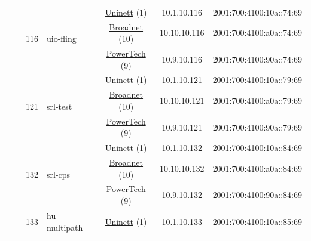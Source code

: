\begin{small}
\begin{center}
\begin{longtable}{|c|c|c|c|c|c|c|c|}
  &  & \multirow{3}{*}{\tiny{116}} & \multicolumn{1}{|l|}{\multirow{3}{*}{\tiny{uio-fling}}} & \multicolumn{2}{|c|}{\tiny{\href{https://www.uninett.no}{Uninett} (1)}} & \tiny{10.1.10.116} & \tiny{2001:700:4100:10a::74:69} \\* \cline{5-5}\cline{6-6}\cline{7-7}\cline{8-8}
  &  &  &  & \multicolumn{2}{|c|}{\tiny{\href{https://www.broadnet.no}{Broadnet} (10)}} & \tiny{10.10.10.116} & \tiny{2001:700:4100:a0a::74:69} \\* \cline{5-5}\cline{6-6}\cline{7-7}\cline{8-8}
  &  &  &  & \multicolumn{2}{|c|}{\tiny{\href{http://www.powertech.no}{PowerTech} (9)}} & \tiny{10.9.10.116} & \tiny{2001:700:4100:90a::74:69} \\* \cline{3-3}\cline{4-4}\cline{5-5}\cline{6-6}\cline{7-7}\cline{8-8}
  &  & \multirow{3}{*}{\tiny{121}} & \multicolumn{1}{|l|}{\multirow{3}{*}{\tiny{srl-test}}} & \multicolumn{2}{|c|}{\tiny{\href{https://www.uninett.no}{Uninett} (1)}} & \tiny{10.1.10.121} & \tiny{2001:700:4100:10a::79:69} \\* \cline{5-5}\cline{6-6}\cline{7-7}\cline{8-8}
  &  &  &  & \multicolumn{2}{|c|}{\tiny{\href{https://www.broadnet.no}{Broadnet} (10)}} & \tiny{10.10.10.121} & \tiny{2001:700:4100:a0a::79:69} \\* \cline{5-5}\cline{6-6}\cline{7-7}\cline{8-8}
  &  &  &  & \multicolumn{2}{|c|}{\tiny{\href{http://www.powertech.no}{PowerTech} (9)}} & \tiny{10.9.10.121} & \tiny{2001:700:4100:90a::79:69} \\* \cline{3-3}\cline{4-4}\cline{5-5}\cline{6-6}\cline{7-7}\cline{8-8}
  &  & \multirow{3}{*}{\tiny{132}} & \multicolumn{1}{|l|}{\multirow{3}{*}{\tiny{srl-cps}}} & \multicolumn{2}{|c|}{\tiny{\href{https://www.uninett.no}{Uninett} (1)}} & \tiny{10.1.10.132} & \tiny{2001:700:4100:10a::84:69} \\* \cline{5-5}\cline{6-6}\cline{7-7}\cline{8-8}
  &  &  &  & \multicolumn{2}{|c|}{\tiny{\href{https://www.broadnet.no}{Broadnet} (10)}} & \tiny{10.10.10.132} & \tiny{2001:700:4100:a0a::84:69} \\* \cline{5-5}\cline{6-6}\cline{7-7}\cline{8-8}
  &  &  &  & \multicolumn{2}{|c|}{\tiny{\href{http://www.powertech.no}{PowerTech} (9)}} & \tiny{10.9.10.132} & \tiny{2001:700:4100:90a::84:69} \\* \cline{3-3}\cline{4-4}\cline{5-5}\cline{6-6}\cline{7-7}\cline{8-8}
  &  & \multirow{3}{*}{\tiny{133}} & \multicolumn{1}{|l|}{\multirow{3}{*}{\tiny{hu-multipath}}} & \multicolumn{2}{|c|}{\tiny{\href{https://www.uninett.no}{Uninett} (1)}} & \tiny{10.1.10.133} & \tiny{2001:700:4100:10a::85:69} \\* \cline{5-5}\cline{6-6}\cline{7-7}\cline{8-8}

\end{longtable}
\end{center}
\end{small}
